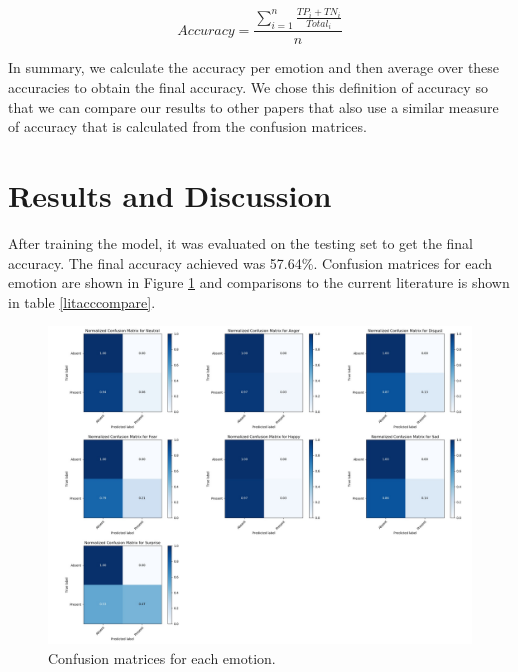 \documentclass[conference]{IEEEtran}
\begin{document}
\begin{equation}
\label{aveacc}
Accuracy = \frac{\sum_{i=1}^{n}\frac{TP_{i} + TN_{i}}{Total_{i}}}{n}
\end{equation}

In summary, we calculate the accuracy per emotion and then average over these accuracies to obtain the final accuracy. We chose this definition of accuracy so that we can compare our results to other papers that also use a similar measure of accuracy that is calculated from the confusion matrices.

\section{Results and Discussion}

After training the model, it was evaluated on the testing set to get the final accuracy. The final accuracy achieved was 57.64\%. Confusion matrices for each emotion are shown in Figure \ref{confusionMatrix} and comparisons to the current literature is shown in table \ref{litacccompare}.

\begin{figure}[h!]
	\centering
	\hspace{6mm}
	\includegraphics[width=\textwidth]{confusion_matrix.png}
	\caption{Confusion matrices for each emotion.}
	\label{confusionMatrix}
\end{figure}
\end{document}
